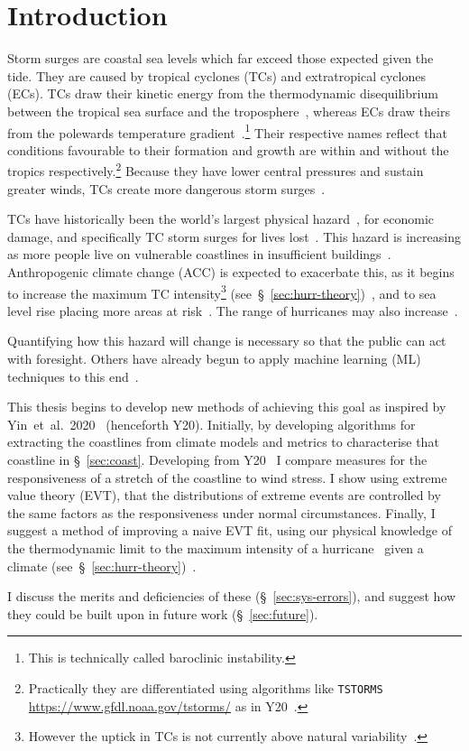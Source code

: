 \section{Introduction}
\label{sec:1_Introduction}


Storm surges are coastal sea levels which far exceed those
expected given the tide.
They are caused by tropical cyclones
(TCs) and extratropical cyclones (ECs).
TCs draw their kinetic energy from the thermodynamic disequilibrium between
the tropical sea surface and the troposphere~\cite{emanuel1986air, emanuel1987dependence},
whereas ECs draw theirs from the
polewards temperature gradient~\cite{lorenz1960energy, holton2004introduction}.\footnote{
This is technically called baroclinic instability.}
Their respective names reflect that conditions favourable
to their formation and growth are within and without the tropics respectively.\footnote{
Practically they are differentiated using algorithms like \texttt{TSTORMS}
\url{https://www.gfdl.noaa.gov/tstorms/} as in Y20~\cite{ZannaPreprint}.}
Because they have lower central pressures and sustain greater winds,
TCs create more dangerous storm surges~\cite{emanuel2005divine}.

TCs have historically been the
world's largest physical hazard~\cite{shultz2005epidemiology},
for economic damage,
and specifically TC storm surges for lives lost~\cite{shultz2005epidemiology,
zhang2009tropical, emanuel2005divine}.
This hazard is increasing as more people live on vulnerable coastlines
in insufficient buildings~\cite{emanuel2005divine}.
Anthropogenic climate change (ACC) is expected to exacerbate this,
as it begins to increase the maximum TC intensity\footnote{
However the uptick in TCs is not currently above
 natural variability~\cite{mendelsohn2012impact}.}
(see~§~\ref{sec:hurr-theory})~\cite{emanuel2008hurricanes,emanuel2017will},
and to sea level rise placing more areas at risk~\cite{SROCC}.
The range of hurricanes may also increase~\cite{fedorov2010tropical}.

Quantifying how this hazard will change is necessary
so that the public can act with foresight.
Others have already begun to apply machine learning (ML) techniques to this
end~\cite{kulp2019new, kulp2018coastaldem, tadesse2020data}.




This thesis begins to develop new methods of achieving this goal
as inspired by Yin~et~al.~2020~\cite{ZannaPreprint} (henceforth Y20). Initially, by
developing algorithms for extracting the coastlines from climate models
and metrics to characterise that coastline in §~\ref{sec:coast}.
Developing from Y20~\cite{ZannaPreprint} I compare measures for the
responsiveness of a stretch of the coastline to wind stress.
I show using extreme value theory (EVT), that the
distributions of extreme events are controlled by the same factors as
the responsiveness under normal circumstances.
Finally, I suggest a
method of improving a naive EVT fit, using our physical knowledge
of the thermodynamic limit
to the maximum intensity of a hurricane~\cite{emanuel1999thermodynamic}
 given a climate (see~§~\ref{sec:hurr-theory})~\cite{emanuel1987dependence, emanuel2016predictability}.


I discuss the merits and deficiencies of these (§~\ref{sec:sys-errors}),
and suggest how they could be built upon in future work (§~\ref{sec:future}).
